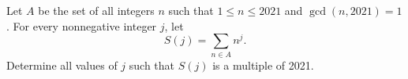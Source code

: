 Let $A$ be the set of all integers $n$ such that $1 \leq n \leq 2021$ and $\gcd(n, 2021) = 1$.
For every nonnegative integer $j$, let
\[
S(j) = \sum_{n \in A} n^j.
\]
Determine all values of $j$ such that $S(j)$ is a multiple of 2021.
